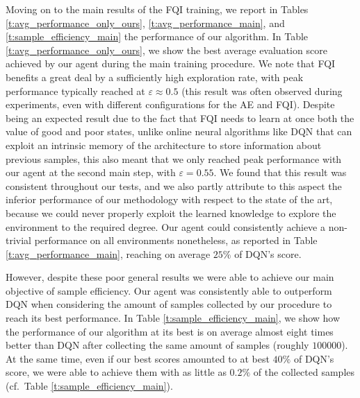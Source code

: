 Moving on to the main results of the FQI training, we report in Tables 
\ref{t:avg_performance_only_ours}, \ref{t:avg_performance_main}, and 
\ref{t:sample_efficiency_main} the performance of our algorithm.
In Table \ref{t:avg_performance_only_ours}, we show the best average evaluation 
score achieved by our agent during the main training procedure.
We note that FQI benefits a great deal by a sufficiently high exploration rate, 
with peak performance typically reached at $\varepsilon\approx0.5$ (this result 
was often observed during experiments, even with different configurations for 
the AE and FQI). 
Despite being an expected result due to the fact that FQI needs to learn at
once both the value of good and poor states, unlike online neural algorithms 
like DQN that can exploit an intrinsic memory of the architecture to store 
information about previous samples, this also meant that we only reached peak 
performance with our agent at the second main step, with $\varepsilon = 0.55$.
We found that this result was consistent throughout our tests, and we also 
partly attribute to this aspect the inferior performance of our methodology with
respect to the state of the art, because we could never properly exploit the 
learned knowledge to explore the environment to the required degree.
Our agent could consistently achieve a non-trivial performance on all
environments nonetheless, as reported in Table \ref{t:avg_performance_main}, 
reaching on average $25\%$ of DQN's score.

However, despite these poor general results we were able to achieve our main
objective of sample efficiency.
Our agent was consistently able to outperform DQN when considering the amount of
samples collected by our procedure to reach its best performance. 
In Table \ref{t:sample_efficiency_main}, we show how the performance of our 
algorithm at its best is on average almost eight times better than DQN after 
collecting the same amount of samples (roughly $100000$).
At the same time, even if our best scores amounted to at best $40\%$ of DQN's 
score, we were able to achieve them with as little as $0.2\%$ of the collected 
samples (cf.\ Table \ref{t:sample_efficiency_main}).

